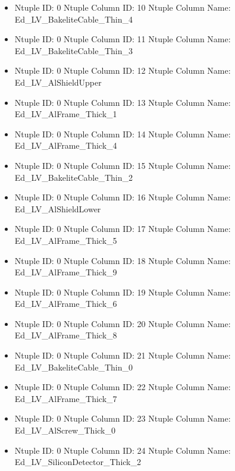 \documentclass[8pt]{beamer}
\begin{document}
\begin{frame}
\begin{itemize}
        \item Ntuple ID: 0 Ntuple Column ID: 10 Ntuple Column Name: Ed\_LV\_BakeliteCable\_Thin\_4
        
        \item Ntuple ID: 0 Ntuple Column ID: 11 Ntuple Column Name: Ed\_LV\_BakeliteCable\_Thin\_3
        
        \item Ntuple ID: 0 Ntuple Column ID: 12 Ntuple Column Name: Ed\_LV\_AlShieldUpper
        
        \item Ntuple ID: 0 Ntuple Column ID: 13 Ntuple Column Name: Ed\_LV\_AlFrame\_Thick\_1
        
        \item Ntuple ID: 0 Ntuple Column ID: 14 Ntuple Column Name: Ed\_LV\_AlFrame\_Thick\_4
        
        \item Ntuple ID: 0 Ntuple Column ID: 15 Ntuple Column Name: Ed\_LV\_BakeliteCable\_Thin\_2
        
        \item Ntuple ID: 0 Ntuple Column ID: 16 Ntuple Column Name: Ed\_LV\_AlShieldLower
        
        \item Ntuple ID: 0 Ntuple Column ID: 17 Ntuple Column Name: Ed\_LV\_AlFrame\_Thick\_5
        
        \item Ntuple ID: 0 Ntuple Column ID: 18 Ntuple Column Name: Ed\_LV\_AlFrame\_Thick\_9
        
        \item Ntuple ID: 0 Ntuple Column ID: 19 Ntuple Column Name: Ed\_LV\_AlFrame\_Thick\_6
        
        \item Ntuple ID: 0 Ntuple Column ID: 20 Ntuple Column Name: Ed\_LV\_AlFrame\_Thick\_8
        
        \item Ntuple ID: 0 Ntuple Column ID: 21 Ntuple Column Name: Ed\_LV\_BakeliteCable\_Thin\_0
        
        \item Ntuple ID: 0 Ntuple Column ID: 22 Ntuple Column Name: Ed\_LV\_AlFrame\_Thick\_7
        
        \item Ntuple ID: 0 Ntuple Column ID: 23 Ntuple Column Name: Ed\_LV\_AlScrew\_Thick\_0
        
        \item Ntuple ID: 0 Ntuple Column ID: 24 Ntuple Column Name: Ed\_LV\_SiliconDetector\_Thick\_2
        

\end{itemize}
\end{frame}
\end{document}
